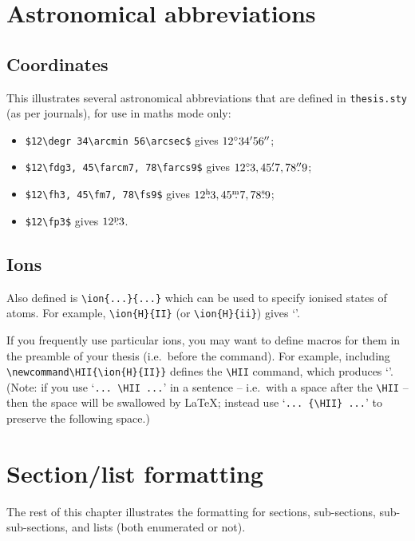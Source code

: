 \section{Astronomical abbreviations}

\subsection{Coordinates}

This illustrates several astronomical abbreviations that are defined in
\verb|thesis.sty| (as per journals), for use in maths mode only:
%
\begin{itemize}
%
\item \verb|$12\degr 34\arcmin 56\arcsec$| gives $12^\circ 34'
56''$;
%
\item \verb|$12\fdg3, 45\farcm7, 78\farcs9$| gives $12^\circ\mkern-6.5mu.\mkern0.5mu3, 45'\mkern-5mu.7,
78''\mkern-8mu.\mkern3mu9$;
%
\item \verb|$12\fh3, 45\fm7, 78\fs9$| gives $12^{\rm h}\mkern-6mu.3, 45^{\rm m}\mkern-8mu.\mkern3mu7, 78^{\rm s}\mkern-6mu.9$;
%
\item \verb|$12\fp3$| gives $12^{\rm p}\mkern-6mu.3$.
%
\end{itemize}

\subsection{Ions}

Also defined is \verb|\ion{...}{...}| which can be used to specify
ionised states of atoms. For example, \verb|\ion{H}{II}| (or
\verb|\ion{H}{ii}|) gives `'.

\newcommand\HII{\ion{H}{II}}

If you frequently use particular ions, you may want to define macros for
them in the preamble of your thesis (i.e.\ before the
\verb|| command). For example, including
\verb|\newcommand\HII{}| defines the \verb|\HII| command,
which produces `\HII'. (Note: if you use `\verb|... \HII ...|' in a
sentence -- i.e.\ with a space after the \verb|\HII| -- then the space
will be swallowed by \LaTeX; instead use `\verb|... {\HII} ...|' to
preserve the following space.)

\section{Section/list formatting}

The rest of this chapter illustrates the formatting for sections,
sub-sections, sub-sub-sections, and lists (both enumerated or not).


